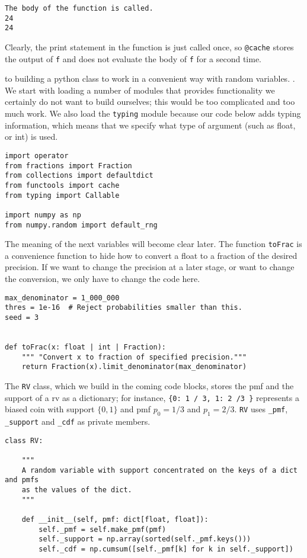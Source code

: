 \documentclass[stochastic-or]{subfiles}
\begin{document}
\begin{verbatim}
The body of the function is called.
24
24
\end{verbatim}

Clearly, the print statement in the function is just called once, so \texttt{@cache} stores the output of \texttt{f} and does not evaluate the body of \texttt{f} for a second time.



 to building a python class to work in a convenient way with random variables.
.
We start with loading a number of modules that provides functionality we certainly do not want to build ourselves; this would be too complicated and too much work.
We also load the \texttt{typing} module because our code below adds typing information, which means that we specify what type of argument (such as float, or int) is used.
\begin{verbatim}
import operator
from fractions import Fraction
from collections import defaultdict
from functools import cache
from typing import Callable

import numpy as np
from numpy.random import default_rng
\end{verbatim}

The meaning of the next variables will become clear later.
The function \texttt{toFrac} is a convenience function to hide how to convert a float to a fraction of the desired precision.
If we want to change the precision at a later stage, or want to change the conversion, we only have to change the code here.
\begin{verbatim}
max_denominator = 1_000_000
thres = 1e-16  # Reject probabilities smaller than this.
seed = 3


def toFrac(x: float | int | Fraction):
    """ "Convert x to fraction of specified precision."""
    return Fraction(x).limit_denominator(max_denominator)
\end{verbatim}

The \texttt{RV} class, which we build in the coming code blocks, stores the pmf and the support of a rv as a dictionary; for instance, \texttt{\{0: 1 / 3, 1: 2 /3 \}} represents a biased coin with support \(\{0, 1\}\) and pmf \(p_{0} = 1/3\) and \(p_{1} = 2/3\). \texttt{RV} uses \texttt{\_pmf}, \texttt{\_support} and \texttt{\_cdf} as private members.

\begin{verbatim}
class RV:

    """
    A random variable with support concentrated on the keys of a dict and pmfs
    as the values of the dict.
    """

    def __init__(self, pmf: dict[float, float]):
        self._pmf = self.make_pmf(pmf)
        self._support = np.array(sorted(self._pmf.keys()))
        self._cdf = np.cumsum([self._pmf[k] for k in self._support])
\end{verbatim}
\end{document}
